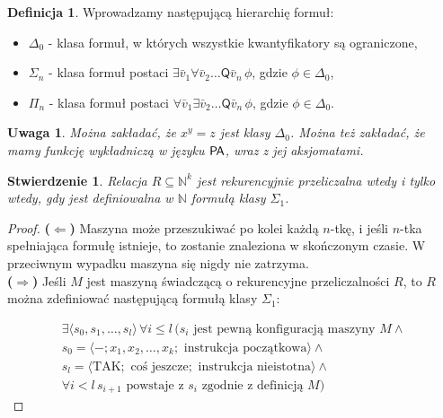 \documentclass{article}
\newcommand{\N}{\mathbb{N}}
\theoremstyle{plain}
\newtheorem{stw}[thm]{Stwierdzenie}
\newtheorem{uw}[thm]{Uwaga}
\theoremstyle{definition}
\newtheorem{df}[thm]{Definicja}
\theoremstyle{remark}
\newcommand{\PA}{\mathsf{P \mkern-1.9mu A}}
\begin{document}

\begin{df}
	 Wprowadzamy następującą hierarchię formuł:
\begin{itemize}
\item $\Delta_0$ - klasa formuł, w których wszystkie kwantyfikatory są
	ograniczone,
\item $\Sigma_n$ - klasa formuł postaci $\exists \bar{v}_1 \forall \bar{v}_2
	\ldots \mathsf{Q} \bar{v}_n\, \phi $, gdzie $\phi \in \Delta_0$,
\item $\Pi_n$ - klasa formuł postaci $\forall \bar{v}_1 \exists \bar{v}_2
	\ldots \mathsf{Q} \bar{v}_n\, \phi $, gdzie $\phi \in \Delta_0$.
\end{itemize}
\end{df}

\begin{uw}
	Można zakładać, że $x^y=z$ jest klasy $\Delta_0$.
	Można też zakładać, że mamy funkcję wykładniczą w języku $\PA$, wraz z
	jej aksjomatami.
\end{uw}

\begin{stw}
	Relacja $R \subseteq \N^k$ jest \emph{rekurencyjnie przeliczalna} wtedy
	i tylko wtedy, gdy jest definiowalna w $\N$ formułą klasy $\Sigma_1$.
\end{stw}
\begin{proof}
  \textbf{($\Leftarrow$)} Maszyna może przeszukiwać po kolei każdą $n$-tkę, i
	jeśli $n$-tka spełniająca formułę istnieje, to zostanie znaleziona w
	skończonym czasie.
	W przeciwnym wypadku maszyna się nigdy nie zatrzyma.
	\\\textbf{($\Rightarrow$)} Jeśli $M$ jest maszyną świadczącą o
	rekurencyjne przeliczalności $R$, to $R$ można zdefiniować następującą
	formułą klasy $\Sigma_1$:

\begin{gather*}
	\exists \langle s_0, s_1, \ldots, s_l \rangle \, \forall i \leq l \,
	(s_i \text{ jest pewną konfiguracją maszyny } M \wedge \\
	s_0 = \langle -; x_1, x_2, \ldots, x_k; \text{ instrukcja początkowa}
	\rangle \wedge\\
	s_l = \langle \text{TAK}; \text{ coś jeszcze};
	\text{ instrukcja nieistotna}
	\rangle \wedge \\
\forall i < l \, s_{i+1} \text{ powstaje z } s_i \text{ zgodnie z definicją } M )
\end{gather*}
\end{proof}
\end{document}
